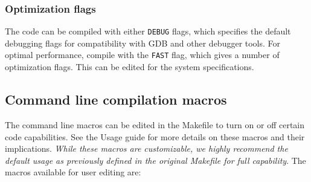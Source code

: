 \documentclass[11pt, oneside]{article}   	%
\begin{document}
\subsubsection{Optimization flags}

The code can be compiled with either \texttt{DEBUG} flags, which specifies the default debugging flags for compatibility with GDB and other debugger tools. For optimal performance, compile with the \texttt{FAST} flag, which gives a number of optimization flags. This can be edited for the system specifications.

\subsection {Command line compilation macros}

The command line macros can be edited in the Makefile to turn on or off certain code capabilities. See the Usage guide for more details on these macros and their implications. \textit{While these macros are customizable, we highly recommend the default usage as previously defined in the original Makefile for full capability}. The macros available for user editing are: \newline
\end{document}
